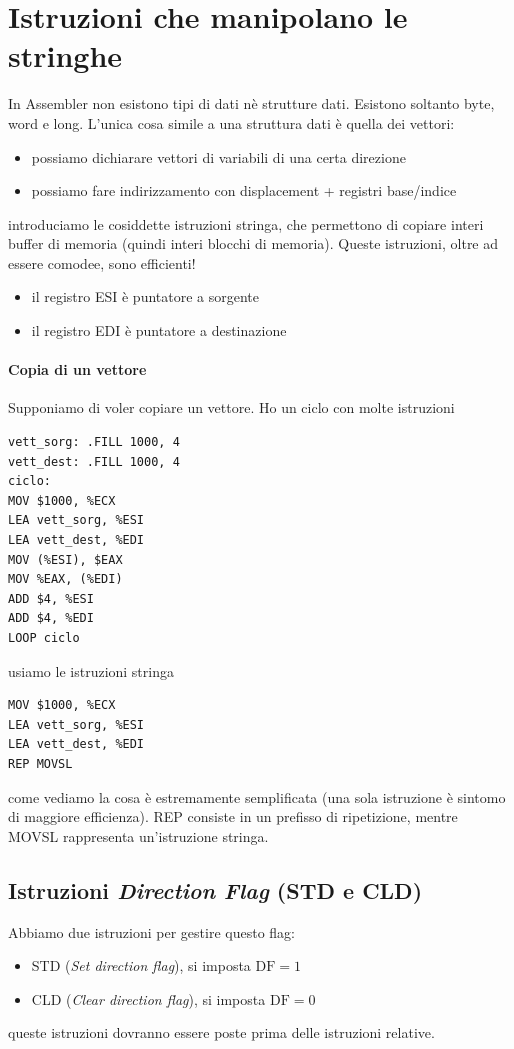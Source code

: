 \documentclass[11pt]{report}
\begin{document}
\section{Istruzioni che manipolano le stringhe}
In Assembler non esistono tipi di dati nè strutture dati. Esistono soltanto byte, word e long. L'unica cosa simile a una struttura dati è quella dei vettori:
\begin{itemize}
\item possiamo dichiarare vettori di variabili di una certa direzione
\item possiamo fare indirizzamento con displacement + registri base/indice
\end{itemize}
introduciamo le cosiddette istruzioni stringa, che permettono di copiare interi buffer di memoria (quindi interi blocchi di memoria). Queste istruzioni, oltre ad essere comodee, sono efficienti! 
\begin{itemize}
\item il registro ESI è puntatore a sorgente
\item il registro EDI è puntatore a destinazione
\end{itemize}
\paragraph{Copia di un vettore} Supponiamo di voler copiare un vettore. Ho un ciclo con molte istruzioni
\begin{verbatim}
vett_sorg: .FILL 1000, 4
vett_dest: .FILL 1000, 4
ciclo:
MOV $1000, %ECX
LEA vett_sorg, %ESI
LEA vett_dest, %EDI
MOV (%ESI), $EAX
MOV %EAX, (%EDI)
ADD $4, %ESI
ADD $4, %EDI
LOOP ciclo
\end{verbatim}
usiamo le istruzioni stringa
\begin{verbatim}
MOV $1000, %ECX
LEA vett_sorg, %ESI
LEA vett_dest, %EDI
REP MOVSL
\end{verbatim}
come vediamo la cosa è estremamente semplificata (una sola istruzione è sintomo di maggiore efficienza). REP consiste in un prefisso di ripetizione, mentre MOVSL rappresenta un'istruzione stringa.
\clearpage
\subsection{Istruzioni \emph{Direction Flag} (STD e CLD)}
Abbiamo due istruzioni per gestire questo flag:
\begin{itemize}
\item STD (\emph{Set direction flag}), si imposta $\text{DF}=1$
\item CLD (\emph{Clear direction flag}), si imposta $\text{DF}=0$
\end{itemize}
queste istruzioni dovranno essere poste prima delle istruzioni relative.
\end{document}
